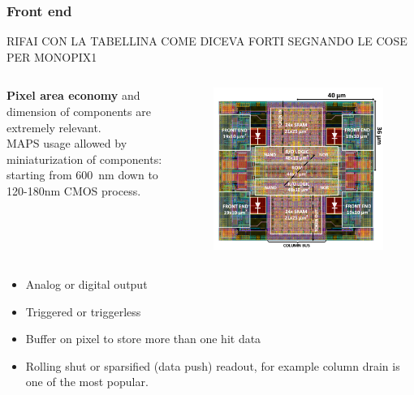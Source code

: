     \begin{frame}
        \frametitle{Front end}
        RIFAI CON LA TABELLINA COME DICEVA FORTI SEGNANDO LE COSE PER MONOPIX1
            \begin{columns}
                \textbf{Pixel area economy} and dimension of components are extremely relevant. \\
                MAPS usage allowed by miniaturization of components: starting from \SI{600}{nm} down to 120-180{nm} CMOS process.
                    \begin{figure}[h!]
                        \vspace*{-0.85cm}
                        \includegraphics[width=1.05\linewidth]{figures/Monopix1/Monopix1_2x2pixelsgroup.png}
                    \end{figure}
            \end{columns}
        \begin{itemize}
            \item Analog or digital output
            \item Triggered or triggerless
            \item Buffer on pixel to store more than one hit data
            \item Rolling shut or sparsified (data push) readout, for example column drain is one of the most popular.
        \end{itemize}
 
    \end{frame} 

